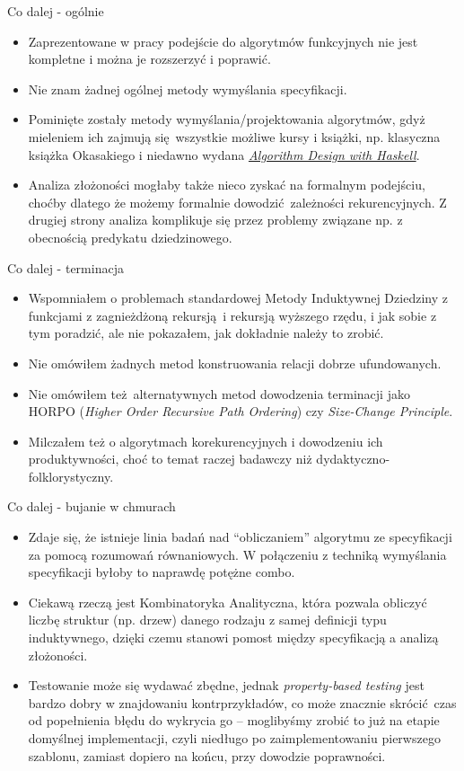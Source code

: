 \documentclass{beamer}
\begin{document}
\begin{frame}{Co dalej - ogólnie}
\begin{itemize}
	\item Zaprezentowane w pracy podejście do algorytmów funkcyjnych nie jest kompletne i można je rozszerzyć i poprawić.
	\item Nie znam żadnej ogólnej metody wymyślania specyfikacji.
	\item Pominięte zostały metody wymyślania/projektowania algorytmów, gdyż mieleniem ich zajmują się wszystkie możliwe kursy i książki, np. klasyczna książka Okasakiego i niedawno wydana \href{https://www.amazon.com/Algorithm-Design-Haskell-Richard-Bird/dp/1108491618}{\textit{Algorithm Design with Haskell}}.
	\item Analiza złożoności mogłaby także nieco zyskać na formalnym podejściu, choćby dlatego że możemy formalnie dowodzić zależności rekurencyjnych. Z drugiej strony analiza komplikuje się przez problemy związane np. z obecnością predykatu dziedzinowego.
\end{itemize}
\end{frame}

\begin{frame}{Co dalej - terminacja}
\begin{itemize}
	\item Wspomniałem o problemach standardowej Metody Induktywnej Dziedziny z funkcjami z zagnieżdżoną rekursją i rekursją wyższego rzędu, i jak sobie z tym poradzić, ale nie pokazałem, jak dokładnie należy to zrobić.
	\item Nie omówiłem żadnych metod konstruowania relacji dobrze ufundowanych.
	\item Nie omówiłem też alternatywnych metod dowodzenia terminacji jako HORPO (\textit{Higher Order Recursive Path Ordering}) czy \textit{Size-Change Principle}.
	\item Milczałem też o algorytmach korekurencyjnych i dowodzeniu ich produktywności, choć to temat raczej badawczy niż dydaktyczno-folklorystyczny.
\end{itemize}
\end{frame}

\begin{frame}{Co dalej - bujanie w chmurach}
\begin{itemize}
	\item Zdaje się, że istnieje linia badań nad ``obliczaniem'' algorytmu ze specyfikacji za pomocą rozumowań równaniowych. W połączeniu z techniką wymyślania specyfikacji byłoby to naprawdę potężne combo.
	\item Ciekawą rzeczą jest Kombinatoryka Analityczna, która pozwala obliczyć liczbę struktur (np. drzew) danego rodzaju z samej definicji typu induktywnego, dzięki czemu stanowi pomost między specyfikacją a analizą złożoności.
	\item Testowanie może się wydawać zbędne, jednak \textit{property-based testing} jest bardzo dobry w znajdowaniu kontrprzykładów, co może znacznie skrócić czas od popełnienia błędu do wykrycia go -- moglibyśmy zrobić to już na etapie domyślnej implementacji, czyli niedługo po zaimplementowaniu pierwszego szablonu, zamiast dopiero na końcu, przy dowodzie poprawności.
\end{itemize}
\end{frame}
\end{document}
